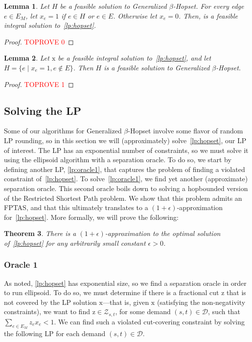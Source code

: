 \documentclass{article}
\newtheorem{theorem}{Theorem}[section]
\newtheorem{lemma}[theorem]{Lemma}
\theoremstyle{definition}
\theoremstyle{remark}
\def\hopset {{\sc Generalized $\beta$-Hopset}}
\begin{document}
\iflong
\begin{lemma}
    Let $H$ be a feasible solution to {\hopset}. For every edge $e \in E_M$, let $x_e = 1$ if $e \in H$ or $e \in E$. Otherwise let $x_e = 0$. Then,  is a feasible integral solution to~\ref{lp:hopset}.
\end{lemma}
\begin{proof}\textcolor{red}{TOPROVE 0}\end{proof}

\begin{lemma}
    Let $\bm{\mathrm{x}}$ be a feasible integral solution to~\ref{lp:hopset}, and let $H = \{ e \; | \; x_e = 1, e \notin E\}$. Then $H$ is a feasible solution to {\hopset}.
\end{lemma}
\begin{proof}\textcolor{red}{TOPROVE 1}\end{proof}
\fi



 
\subsection{Solving the LP}

Some of our algorithms for {\hopset} involve some flavor of random LP rounding, so in this section we will (approximately) solve~\ref{lp:hopset}, our LP of interest. The LP has an exponential number of constraints, so we must solve it using the ellipsoid algorithm with a separation oracle. To do so, we start by defining another LP, \ref{lp:oracle1}, that captures the problem of finding a violated constraint of~\ref{lp:hopset}. To solve~\ref{lp:oracle1}, we find yet another (approximate) separation oracle. This second oracle boils down to solving a hopbounded version of the Restricted Shortest Path problem. We show that this problem admits an FPTAS, and that this ultimately translates to a $(1+\epsilon)$-approximation for~\ref{lp:hopset}. More formally, we will prove the following:

\begin{theorem} \label{thm:solve_LP}
    There is a $(1+\epsilon)$-approximation to the optimal solution of~\ref{lp:hopset} for any arbitrarily small constant $\epsilon > 0$.
\end{theorem}

\subsubsection{Oracle 1}
As noted, \ref{lp:hopset} has exponential size, so we find a separation oracle in order to run ellipsoid. To do so, we must determine if there is a fractional cut $\bm{\mathrm{z}}$ that is not covered by the LP solution $\bm{\mathrm{x}}$---that is, given $\bm{\mathrm{x}}$ (satisfying the non-negativity constraints), we want to find $\bm{\mathrm{z}} \in \mathcal{Z}_{s,t}$, for some demand $(s,t) \in \mathcal{D}$, such that $\sum_{e \in E_M} z_e x_e < 1$. We can find such a violated cut-covering constraint by solving the following LP for each demand $(s,t) \in \mathcal{D}$.
\end{document}
